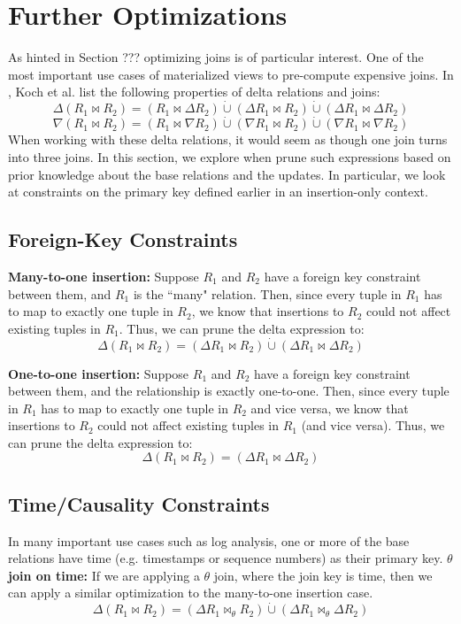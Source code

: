 \section{Further Optimizations}
As hinted in Section ??? optimizing joins is of particular interest. 
One of the most important use cases of materialized views to pre-compute expensive joins.
In \cite{DBLP:journals/vldb/KochAKNNLS14}, Koch et al. list the following properties of delta relations and joins:
\[ \Delta(R_1 \bowtie R_2) =  (R_1 \bowtie \Delta R_2) \dot{\cup} (\Delta R_1 \bowtie  R_2) \dot{\cup} (\Delta R_1 \bowtie  \Delta R_2)\]
\[ \nabla(R_1 \bowtie R_2) =  (R_1 \bowtie \nabla R_2) \dot{\cup} (\nabla R_1 \bowtie  R_2) \dot{\cup} (\nabla R_1 \bowtie  \nabla R_2)\]
When working with these delta relations, it would seem as though one join turns into three joins.
In this section, we explore when prune such expressions based on prior knowledge about the base relations and the updates.
In particular, we look at constraints on the primary key defined earlier in an insertion-only context.

\subsection{Foreign-Key Constraints}


\textbf{Many-to-one insertion: } Suppose $R_1$ and $R_2$ have a foreign key constraint between them, and $R_1$ is the ``many" relation. Then, since every tuple in $R_1$ has to map to exactly one tuple in $R_2$, we know that insertions to $R_2$ could not affect existing tuples in $R_1$. Thus, we can prune the delta expression to:
\[ \Delta(R_1 \bowtie R_2) =  (\Delta R_1 \bowtie  R_2) \dot{\cup} (\Delta R_1 \bowtie  \Delta R_2)\]

\textbf{One-to-one insertion: } Suppose $R_1$ and $R_2$ have a foreign key constraint between them, and the relationship is exactly one-to-one. Then, since every tuple in $R_1$ has to map to exactly one tuple in $R_2$ and vice versa, we know that insertions to $R_2$ could not affect existing tuples in $R_1$ (and vice versa). Thus, we can prune the delta expression to:
\[ \Delta(R_1 \bowtie R_2) =  (\Delta R_1 \bowtie  \Delta R_2)\]

\subsection{Time/Causality Constraints}
In many important use cases such as log analysis, one or more of the base relations have time (e.g. timestamps or sequence numbers) as their primary key.
\textbf{$\theta$ join on time: } If we are applying a $\theta$ join, where the join key is time, then we can apply a similar optimization to the many-to-one insertion case.
\[ \Delta(R_1 \bowtie R_2) =   (\Delta R_1 \bowtie_{\theta}  R_2) \dot{\cup} (\Delta R_1 \bowtie_{\theta}  \Delta R_2)\]

